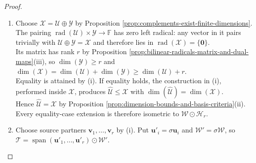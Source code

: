 \begin{theorem}
\begin{proof}
\begin{enumerate}[label=(\roman*)]
Hence $\mathbf{u}_j\notin\mathcal{S}_j$. The equality $\mathcal{S}_j^{\perp\perp}=\mathcal{S}_j$ holds by Theorem \ref{thm:metric-orthogonal-complement-dimension}(iii). Since $\mathbf{u}_j\notin\mathcal{S}_j^{\perp\perp}$, fix $\mathbf{x}\in\mathcal{S}_j^{\perp}$ with $c\defeq\innerprod{\mathbf{u}_j,\mathbf{x}}\neq0$.\\
The inclusion $\mathbf{u}_j\in\mathcal{S}_j^{\perp}$ holds by the radical property and the preceding stages.\\
Set $\mathbf{v}_j=c^{-1}\mathbf{x}$ in the symplectic case and $\mathbf{v}_j=c^{-1}\mathbf{x}-\frac{\innerprod{\mathbf{x},\mathbf{x}}}{2c^2}\mathbf{u}_j$ in the orthogonal case.\\
Then $\mathbf{v}_j\in\mathcal{S}_j^{\perp}$, $\innerprod{\mathbf{u}_j,\mathbf{v}_j}=1$, and $\innerprod{\mathbf{v}_j,\mathbf{v}_j}=0$ by alternation or the correction calculation. Put $\mathcal{H}_j=\mathcal{H}_{j-1}\odot\operatorname{span}(\mathbf{u}_j,\mathbf{v}_j)$.\\
After $r$ stages, $\mathcal{H}_r$ is hyperbolic, $\mathcal{U}\leq\widehat{\mathcal{U}}\defeq\mathcal{H}_r\odot\mathcal{W}$, and $\dim(\widehat{\mathcal{U}})=2r+\dim(\mathcal{W})=\dim(\mathcal{U})+r$.
\item[$(ii)$] Choose $\mathcal{X}=\mathcal{U}\oplus\mathcal{Y}$ by Proposition \ref{prop:complements-exist-finite-dimensions}.\\
The pairing $\operatorname{rad}(\mathcal{U})\times\mathcal{Y}\to\mathbb{F}$ has zero left radical: any vector in it pairs trivially with $\mathcal{U}\oplus\mathcal{Y}=\mathcal{X}$ and therefore lies in $\operatorname{rad}(\mathcal{X})=\{\mathbf{0}\}$.\\
Its matrix has rank $r$ by Proposition \ref{prop:bilinear-radicals-matrix-and-dual-maps}(iii), so $\dim(\mathcal{Y})\geq r$ and $\dim(\mathcal{X})=\dim(\mathcal{U})+\dim(\mathcal{Y})\geq\dim(\mathcal{U})+r$.\\
Equality is attained by (i). If equality holds, the construction in (i), performed inside $\mathcal{X}$, produces $\widehat{\mathcal{U}}\leq\mathcal{X}$ with $\dim(\widehat{\mathcal{U}})=\dim(\mathcal{X})$.\\
Hence $\widehat{\mathcal{U}}=\mathcal{X}$ by Proposition \ref{prop:dimension-bounds-and-basis-criteria}(ii). Every equality-case extension is therefore isometric to $\mathcal{W}\odot\mathcal{H}_r$.
\item[$(iii)$] Choose source partners $\mathbf{v}_1,\ldots,\mathbf{v}_r$ by (i). Put $\mathbf{u}'_i=\sigma\mathbf{u}_i$ and $\mathcal{W}'=\sigma\mathcal{W}$, so $\mathcal{T}=\operatorname{span}(\mathbf{u}'_1,\ldots,\mathbf{u}'_r)\odot\mathcal{W}'$.\\

\end{enumerate}
\end{proof}
\end{theorem}
